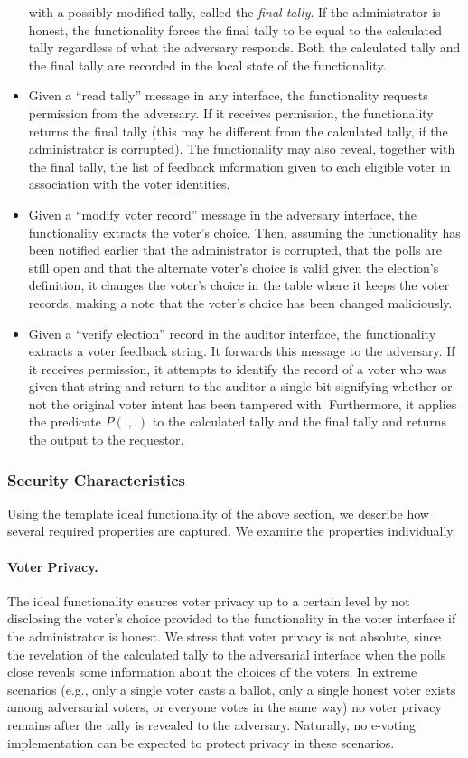 \begin{itemize}
  with a possibly modified tally, called the {\em final tally}. If the
  administrator is honest, the functionality forces the final tally to
  be equal to the calculated tally regardless of what the adversary
  responds. Both the calculated tally and the final tally are recorded
  in the local state of the functionality.
\item Given a ``read tally'' message in any interface, the
  functionality requests permission from the adversary. If it receives
  permission, the functionality returns the final tally (this may be
  different from the calculated tally, if the administrator is
  corrupted). The functionality may also reveal, together with the
  final tally, the list of feedback information given to each eligible
  voter in association with the voter identities.
\item Given a ``modify voter record'' message in the adversary
  interface, the functionality extracts the voter's choice. Then,
  assuming the functionality has been notified earlier that the
  administrator is corrupted, that the polls are still open and that
  the alternate voter's choice is valid given the election's
  definition, it changes the voter's choice in the table where it
  keeps the voter records, making a note that the voter's choice has
  been changed maliciously.
\item Given a ``verify election'' record in the auditor interface, the
  functionality extracts a voter feedback string. It forwards this
  message to the adversary. If it receives permission, it attempts to
  identify the record of a voter who was given that string and return
  to the auditor a single bit signifying whether or not the original
  voter intent has been tampered with. Furthermore, it applies the
  predicate $P(.,.)$ to the calculated tally and the final tally and
  returns the output to the requestor. 
\end{itemize}

\subsubsection{Security Characteristics}

Using the template ideal functionality of the above section, we
describe how several required properties are captured. We examine
the properties individually.

\paragraph{Voter Privacy.}  The ideal functionality ensures voter
privacy up to a certain level by not disclosing the voter's choice
provided to the functionality in the voter interface if the
administrator is honest. We stress that voter privacy is not absolute,
since the revelation of the calculated tally to the adversarial
interface when the polls close reveals some information about the
choices of the voters. In extreme scenarios (e.g., only a single voter
casts a ballot, only a single honest voter exists among adversarial
voters, or everyone votes in the same way) no voter privacy remains
after the tally is revealed to the adversary. Naturally, no e-voting
implementation can be expected to protect privacy in these scenarios.

